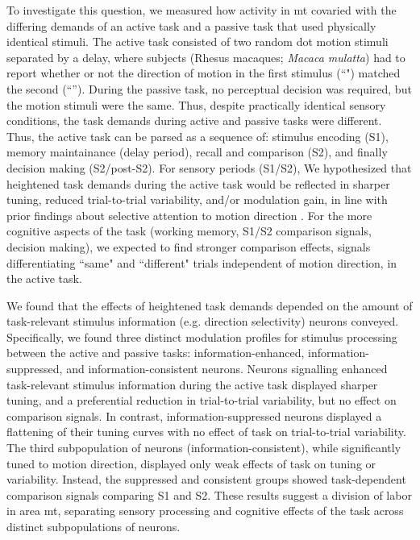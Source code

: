 To investigate this question, we measured how activity in \gls{mt} covaried with the differing demands of an active task and a passive task that used physically identical stimuli. The active task consisted of two random dot motion stimuli separated by a delay, where subjects (Rhesus macaques; \textit{Macaca mulatta}) had to report whether or not the direction of motion in the first stimulus (``\sample") matched the second (``\test''). During the passive task, no perceptual decision was required, but the motion stimuli were the same. Thus, despite practically identical sensory conditions, the task demands during active and passive tasks were different. Thus, the active task can be parsed as a sequence of: stimulus encoding (S1), memory maintainance (delay period), recall and comparison (S2), and finally decision making (S2/post-S2). For sensory periods (S1/S2), We hypothesized that heightened task demands during the active task would be reflected in sharper tuning, reduced trial-to-trial variability, and/or modulation gain, in line with prior findings about selective attention to motion direction \parencite{Trujillo2004, Ponce-Alvarez2013, Cohen2008, Arandia-Romero2016}. For the more cognitive aspects of the task (working memory, S1/S2 comparison signals, decision making), we expected to find stronger comparison effects, signals differentiating ``same" and ``different" trials independent of motion direction, in the active task. 

We found that the effects of heightened task demands depended on the amount of task-relevant stimulus information (e.g. direction selectivity) neurons conveyed. Specifically, we found three distinct modulation profiles for stimulus processing between the active and passive tasks: information-enhanced, information-suppressed, and \mbox{information-consistent} neurons. Neurons signalling enhanced task-relevant stimulus information during the active task displayed sharper tuning, and a preferential reduction in trial-to-trial variability, but no effect on comparison signals. In contrast, information-suppressed neurons displayed a flattening of their tuning curves with no effect of task on trial-to-trial variability. The third subpopulation of neurons (information-consistent), while significantly tuned to motion direction, displayed only weak effects of task on tuning or variability. Instead, the suppressed and consistent groups showed task-dependent comparison signals comparing S1 and S2. These results suggest a division of labor in area \gls{mt}, separating sensory processing and cognitive effects of the task across distinct subpopulations of neurons.

